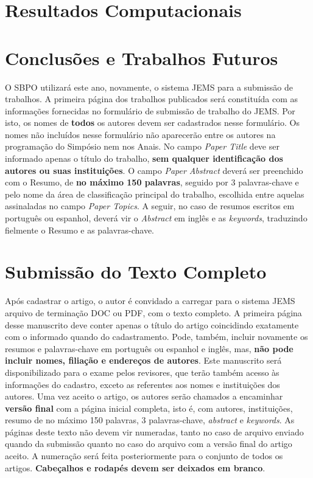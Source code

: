 \documentclass[11pt]{article}
\begin{document}
\section{Resultados Computacionais}
\section{Conclusões e Trabalhos Futuros}


O SBPO utilizará este ano, novamente, o sistema JEMS para a submissão de trabalhos. A primeira página dos trabalhos publicados será constituída com as informações fornecidas no formulário de submissão de trabalho do JEMS. Por isto, os nomes de \textbf{todos} os autores devem ser cadastrados nesse formulário. Os nomes  não incluídos nesse formulário não aparecerão entre os autores na programação do Simpósio nem nos Anais.
No campo \textit{Paper Title }deve ser informado apenas o título do trabalho, \textbf{sem qualquer identificação dos autores ou suas instituições}. 
O campo \textit{Paper Abstract} deverá ser preenchido com o Resumo, de \textbf{no máximo 150 palavras}, seguido por 3 palavras-chave e pelo nome da área de classificação principal do trabalho, escolhida entre aquelas assinaladas no campo \textit{Paper Topics}. A seguir, no caso de resumos escritos em português ou espanhol, deverá vir o \textit{Abstract} em inglês e as \textit{keywords}, traduzindo fielmente o Resumo e as palavras-chave. 


\section{Submissão do Texto Completo}

Após cadastrar o artigo, o autor é convidado a carregar para o sistema JEMS arquivo de terminação DOC ou PDF, com o texto completo. A primeira página desse manuscrito deve conter apenas o título do artigo coincidindo exatamente com o informado quando do cadastramento. Pode, também, incluir novamente os resumos e palavras-chave em português ou espanhol e inglês, mas, \textbf{não pode incluir nomes, filiação e endereços de autores}.
Este manuscrito será disponibilizado para o exame pelos revisores, que terão também acesso às informações do cadastro, exceto as referentes aos nomes e instituições dos autores. Uma vez aceito o artigo, os autores serão chamados a encaminhar \textbf{versão final} com a página inicial completa, isto é, com autores, instituições, resumo de no máximo 150 palavras, 3 palavras-chave, \textit{abstract} e \textit{keywords}.
As páginas deste texto não devem vir numeradas, tanto no caso de arquivo enviado quando da submissão quanto no caso do arquivo com a versão final do artigo aceito. A numeração será feita posteriormente para o conjunto de todos os artigos. \textbf{Cabeçalhos e rodapés devem ser deixados em branco}.
\end{document}

